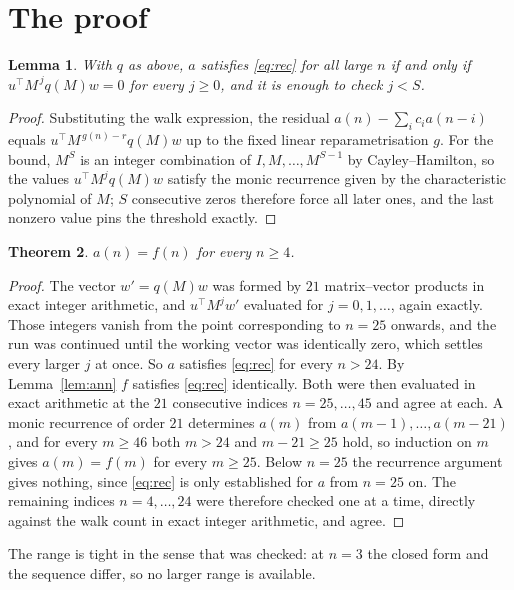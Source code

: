 \documentclass[11pt,a4paper]{article}
\theoremstyle{plain}
\newtheorem{theorem}{Theorem}
\newtheorem{lemma}[theorem]{Lemma}
\theoremstyle{definition}
\begin{document}
\section{The proof}

\begin{lemma}\label{lem:crit}
With $q$ as above, $a$ satisfies \eqref{eq:rec} for all large $n$ if and only if
$u^{\!\top}M^{\,j}q(M)w=0$ for every $j\ge0$, and it is enough to check $j<S$.
\end{lemma}

\begin{proof}
Substituting the walk expression, the residual $a(n)-\sum_ic_ia(n-i)$ equals
$u^{\!\top}M^{\,g(n)-r}q(M)w$ up to the fixed linear reparametrisation $g$. For the bound,
$M^{S}$ is an integer combination of $I,M,\dots,M^{S-1}$ by Cayley--Hamilton, so the values
$u^{\!\top}M^{j}q(M)w$ satisfy the monic recurrence given by the characteristic polynomial of
$M$; $S$ consecutive zeros therefore force all later ones, and the last nonzero value pins the
threshold exactly.
\end{proof}

\begin{theorem}
$a(n)=f(n)$ for every $n\ge4$.
\end{theorem}

\begin{proof}
The vector $w'=q(M)w$ was formed by $21$ matrix--vector products in exact integer
arithmetic, and $u^{\!\top}M^{j}w'$ evaluated for $j=0,1,\dots$, again exactly. Those integers
vanish from the point corresponding to $n=25$ onwards, and the run was continued until the
working vector was identically zero, which settles every larger $j$ at once. So $a$ satisfies
\eqref{eq:rec} for every $n>24$. By Lemma~\ref{lem:ann} $f$ satisfies \eqref{eq:rec}
identically. Both were then evaluated in exact arithmetic at the $21$ consecutive indices
$n=25,\dots,45$ and agree at each. A monic recurrence of order $21$
determines $a(m)$ from $a(m-1),\dots,a(m-21)$, and for every $m\ge46$ both
$m>24$ and $m-21\ge25$ hold, so induction on $m$ gives $a(m)=f(m)$ for every
$m\ge25$.
Below $n=25$ the recurrence argument gives nothing, since \eqref{eq:rec} is only
established for $a$ from $n=25$ on. The remaining indices $n=4,\dots,24$ were
therefore checked one at a time, directly against the walk count in exact integer arithmetic,
and agree.
\end{proof}

The range is tight in the sense that was checked: at $n=3$ the closed form and the sequence differ, so no larger range is available.
\end{document}
